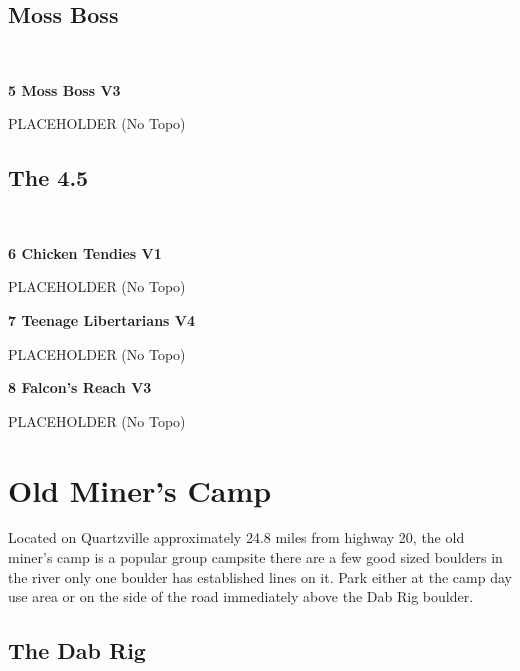 \begin{multicols}{2}
			\subsection*{Moss Boss}\label{bf:Moss Boss}
			\
			
					\label{rt:Moss Boss} \colorbox{green!20}{\textbf{5 Moss Boss V3   }}
					\begin{adjustwidth}{1cm}{}
					PLACEHOLDER
						\newline (No Topo) 
					\end{adjustwidth}
			\subsection*{The 4.5}\label{bf:The 4.5}
			\
			
					\label{rt:Chicken Tendies} \colorbox{green!20}{\textbf{6 Chicken Tendies V1 \ding{72}  }}
					\begin{adjustwidth}{1cm}{}
					PLACEHOLDER
						\newline (No Topo) 
					\end{adjustwidth}
					\label{rt:Teenage Libertarians} \colorbox{RoyalBlue!20}{\textbf{7 Teenage Libertarians V4     }}
					\begin{adjustwidth}{1cm}{}
					PLACEHOLDER
						\newline (No Topo) 
					\end{adjustwidth}
					\label{rt:Falcon's Reach} \colorbox{green!20}{\textbf{8 Falcon's Reach V3 \ding{72}  }}
					\begin{adjustwidth}{1cm}{}
					PLACEHOLDER
						\newline (No Topo) 
					\end{adjustwidth}
		\section{Old Miner's Camp}\label{sa:Old Miner's Camp}
	Located on Quartzville approximately 24.8 miles from highway 20, the old miner's camp is a popular group campsite there are a few good sized boulders in the river only one boulder has established lines on it. Park either at the camp day use area or on the side of the road immediately above the Dab Rig boulder.
			\subsection*{The Dab Rig}\label{bf:The Dab Rig}
			\
			

\end{multicols}
